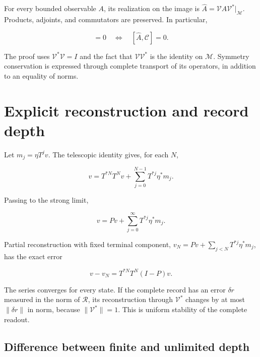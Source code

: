 \begin{corollary}
For every bounded observable \(A\), its realization on the image is \(\widehat A=\mathcal V A\mathcal V^*|_{\mathcal M}\). Products, adjoints, and commutators are preserved. In particular,

\begin{equation}
[A,C]=0\quad\Longleftrightarrow\quad[\widehat A,\mathcal C]=0.
\label{x_reciprocidad:nuc03:eq:7}
\end{equation}
\end{corollary}

The proof uses \(\mathcal V^*\mathcal V=I\) and the fact that \(\mathcal V\mathcal V^*\) is the identity on \(\mathcal M\). Symmetry conservation is expressed through complete transport of its operators, in addition to an equality of norms.

\section{Explicit reconstruction and record depth}

Let \(m_j=\eta T^jv\). The telescopic identity gives, for each \(N\),

\begin{equation}
\boxed{v=T^{*N}T^Nv+\sum_{j=0}^{N-1}T^{*j}\eta^*m_j.}
\label{x_reciprocidad:nuc03:eq:8}
\end{equation}

Passing to the strong limit,

\begin{equation}
\boxed{v=Pv+\sum_{j=0}^{\infty}T^{*j}\eta^*m_j.}
\label{x_reciprocidad:nuc03:eq:9}
\end{equation}

Partial reconstruction with fixed terminal component,
\(v_N=Pv+\sum_{j<N}T^{*j}\eta^*m_j\), has the exact error

\begin{equation}
v-v_N=T^{*N}T^N(I-P)v.
\label{x_reciprocidad:nuc03:eq:10}
\end{equation}

The series converges for every state. If the complete record has an error \(\delta r\) measured in the norm of \(\mathcal R\), its reconstruction through \(\mathcal V^*\) changes by at most \(\|\delta r\|\) in norm, because \(\|\mathcal V^*\|=1\). This is uniform stability of the complete readout.

\subsection{Difference between finite and unlimited depth}


